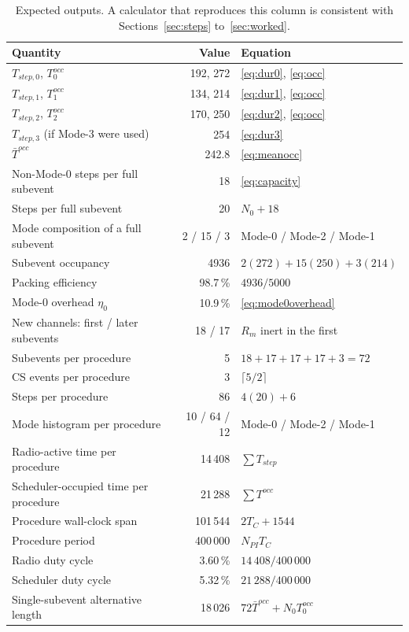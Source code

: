 \documentclass[11pt,a4paper]{article}
\newcommand{\Tconn}{T_{C}}
\newcommand{\Npi}{N_{PI}}
\begin{document}
\begin{table}[h]
\caption{Expected outputs. A calculator that reproduces this column is consistent with
Sections~\ref{sec:steps} to~\ref{sec:worked}.}
\label{tab:vec-out}
\centering\small
\begin{tabular}{@{}L{62mm}rL{44mm}@{}}
\toprule
Quantity & Value & Equation \\
\midrule
$T_{step,0}$, $T^{occ}_0$ & 192, 272 & \eqref{eq:dur0}, \eqref{eq:occ} \\
$T_{step,1}$, $T^{occ}_1$ & 134, 214 & \eqref{eq:dur1}, \eqref{eq:occ} \\
$T_{step,2}$, $T^{occ}_2$ & 170, 250 & \eqref{eq:dur2}, \eqref{eq:occ} \\
$T_{step,3}$ (if Mode-3 were used) & 254 & \eqref{eq:dur3} \\
$\bar{T}^{occ}$ & 242.8 & \eqref{eq:meanocc} \\
Non-Mode-0 steps per full subevent & 18 & \eqref{eq:capacity} \\
Steps per full subevent & 20 & $N_0 + 18$ \\
Mode composition of a full subevent & 2 / 15 / 3 & Mode-0 / Mode-2 / Mode-1 \\
Subevent occupancy & 4936 & $2(272)+15(250)+3(214)$ \\
Packing efficiency & 98.7\,\% & $4936/5000$ \\
Mode-0 overhead $\eta_0$ & 10.9\,\% & \eqref{eq:mode0overhead} \\
New channels: first / later subevents & 18 / 17 & $R_m$ inert in the first \\
Subevents per procedure & 5 & $18+17+17+17+3 = 72$ \\
CS events per procedure & 3 & $\lceil 5/2 \rceil$ \\
Steps per procedure & 86 & $4(20)+6$ \\
Mode histogram per procedure & 10 / 64 / 12 & Mode-0 / Mode-2 / Mode-1 \\
Radio-active time per procedure & 14\,408 & $\sum T_{step}$ \\
Scheduler-occupied time per procedure & 21\,288 & $\sum T^{occ}$ \\
Procedure wall-clock span & 101\,544 & $2\Tconn + 1544$ \\
Procedure period & 400\,000 & $\Npi \Tconn$ \\
Radio duty cycle & 3.60\,\% & $14\,408/400\,000$ \\
Scheduler duty cycle & 5.32\,\% & $21\,288/400\,000$ \\
Single-subevent alternative length & 18\,026 & $72\bar{T}^{occ} + N_0 T^{occ}_0$ \\
\bottomrule
\end{tabular}
\end{table}
\end{document}
